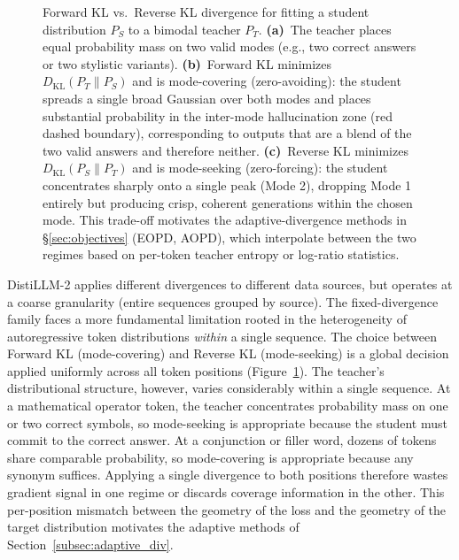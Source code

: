 \documentclass{article} %
\newcommand{\KL}{D_{\mathrm{KL}}}
\begin{document}
\begin{figure}[!htbp]
{\begin{tikzpicture}[>=Stealth]
\end{tikzpicture}
}
\caption{Forward KL vs.\ Reverse KL divergence for fitting a student distribution $P_S$ to a bimodal teacher $P_T$. \textbf{(a)}~The teacher places equal probability mass on two valid modes (e.g., two correct answers or two stylistic variants). \textbf{(b)}~Forward KL minimizes $\KL(P_T \parallel P_S)$ and is mode-covering (zero-avoiding): the student spreads a single broad Gaussian over both modes and places substantial probability in the inter-mode hallucination zone (red dashed boundary), corresponding to outputs that are a blend of the two valid answers and therefore neither. \textbf{(c)}~Reverse KL minimizes $\KL(P_S \parallel P_T)$ and is mode-seeking (zero-forcing): the student concentrates sharply onto a single peak (Mode 2), dropping Mode 1 entirely but producing crisp, coherent generations within the chosen mode. This trade-off motivates the adaptive-divergence methods in \S\ref{sec:objectives} (EOPD, AOPD), which interpolate between the two regimes based on per-token teacher entropy or log-ratio statistics.}
\label{fig:kl_divergence}
\end{figure}

DistiLLM-2 applies different divergences to different data sources, but operates at a coarse granularity (entire sequences grouped by source). The fixed-divergence family faces a more fundamental limitation rooted in the heterogeneity of autoregressive token distributions \emph{within} a single sequence. The choice between Forward KL (mode-covering) and Reverse KL (mode-seeking) is a global decision applied uniformly across all token positions (Figure~\ref{fig:kl_divergence}). The teacher's distributional structure, however, varies considerably within a single sequence. At a mathematical operator token, the teacher concentrates probability mass on one or two correct symbols, so mode-seeking is appropriate because the student must commit to the correct answer. At a conjunction or filler word, dozens of tokens share comparable probability, so mode-covering is appropriate because any synonym suffices. Applying a single divergence to both positions therefore wastes gradient signal in one regime or discards coverage information in the other. This per-position mismatch between the geometry of the loss and the geometry of the target distribution motivates the adaptive methods of Section~\ref{subsec:adaptive_div}.
\end{document}
